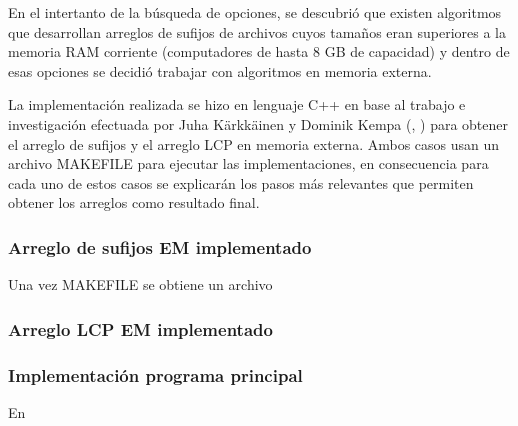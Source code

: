 En el intertanto de la búsqueda de opciones, se descubrió que existen algoritmos que desarrollan arreglos de sufijos de archivos cuyos tamaños eran superiores a la memoria RAM corriente (computadores de hasta 8 GB de capacidad) y dentro de esas opciones se decidió trabajar con algoritmos en memoria externa.

La implementación realizada se hizo en lenguaje C++ en base al trabajo e investigación efectuada por Juha Kärkkäinen y Dominik Kempa (\cite{sascan}, \cite{emsparse}) para obtener el arreglo de sufijos y el arreglo LCP en memoria externa. Ambos casos usan un archivo MAKEFILE para ejecutar las implementaciones, en consecuencia para cada uno de estos casos se explicarán los pasos más relevantes que permiten obtener los arreglos como resultado final.

\subsubsection{Arreglo de sufijos EM implementado}

Una vez MAKEFILE se obtiene un archivo 

\subsubsection{Arreglo LCP EM implementado}

\subsubsection{Implementación programa principal}

En \cite{sascan}